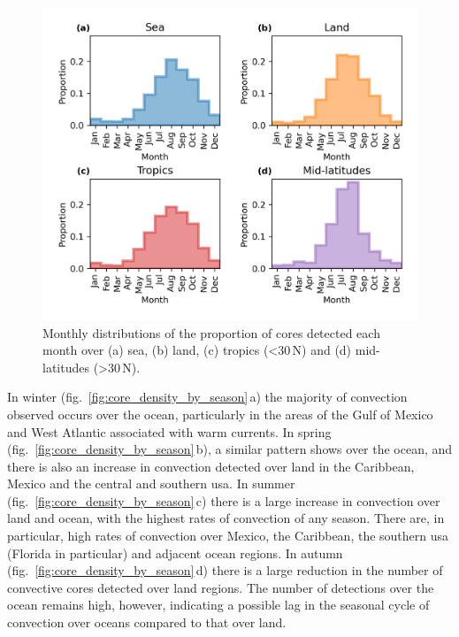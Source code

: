 \begin{figure}[!tp]
    \centering
    \includegraphics[width=\textwidth]{figures/chapter2_04.png}
    \caption[
    Monthly distributions of the proportion of cores detected each month over land, sea, tropics and mid-latitudes
    ]{
    Monthly distributions of the proportion of cores detected each month over (a) sea, (b) land, (c) tropics (\textless 30\,\textdegree N) and (d) mid-latitudes (\textgreater 30\,\textdegree N).
    }
    \label{fig:core_annual_land_sea}
\end{figure}

In winter (fig.~\ref{fig:core_density_by_season}\,a) the majority of convection observed occurs over the ocean, particularly in the areas of the Gulf of Mexico and West Atlantic associated with warm currents.
In spring (fig.~\ref{fig:core_density_by_season}\,b), a similar pattern shows over the ocean, and there is also an increase in convection detected over land in the Caribbean, Mexico and the central and southern \acrshort{usa}.
In summer (fig.~\ref{fig:core_density_by_season}\,c) there is a large increase in convection over land and ocean, with the highest rates of convection of any season.
There are, in particular, high rates of convection over Mexico, the Caribbean, the southern \acrshort{usa} (Florida in particular) and adjacent ocean regions.
In autumn (fig.~\ref{fig:core_density_by_season}\,d) there is a large reduction in the number of convective cores detected over land regions.
The number of detections over the ocean remains high, however, indicating a possible lag in the seasonal cycle of convection over oceans compared to that over land.

